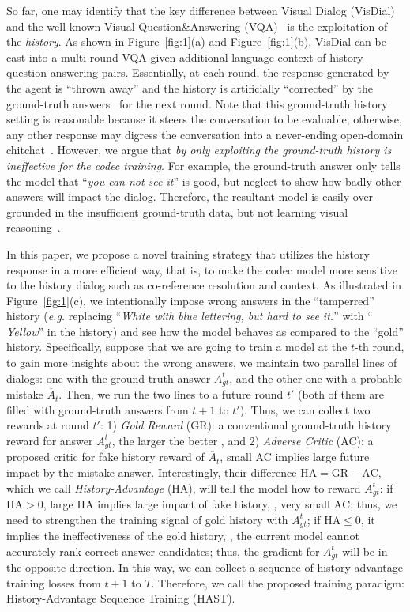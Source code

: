 \documentclass[10pt,twocolumn,letterpaper]{article}
\begin{document}
So far, one may identify that the key difference between Visual Dialog (VisDial) and the well-known Visual Question\&Answering (VQA)~\cite{antol2015vqa} is the exploitation of the \emph{history}. As shown in Figure~\ref{fig:1}(a) and Figure~\ref{fig:1}(b), VisDial can be cast into a multi-round VQA given additional language context of history question-answering pairs. Essentially, at each round, the response generated by the agent is ``thrown away'' and the history is artificially ``corrected'' by the ground-truth answers~\cite{das2017visual} for the next round. Note that this ground-truth history setting is reasonable because it steers the conversation to be evaluable; otherwise, any other response may digress the conversation into a never-ending open-domain chitchat~\cite{quarteroni2009designing,higashinaka2014towards}. However, we argue that \emph{by only exploiting the ground-truth history is ineffective for the codec training}. For example, the ground-truth answer only tells the model that ``\emph{you can not see it}'' is good, but neglect to show how badly other answers will impact the dialog. Therefore, the resultant model is easily over-grounded in the insufficient ground-truth data, but not learning visual reasoning~\cite{lake2017building}. 


In this paper, we propose a novel training strategy that utilizes the history response in a more efficient way, that is, to make the codec model more sensitive to the history dialog such as co-reference resolution and context. As illustrated in Figure~\ref{fig:1}(c), we intentionally impose wrong answers in the ``tamperred'' history (\emph{e.g.} replacing ``\emph{White with blue lettering, but hard to see it.}'' with ``\emph{ Yellow}'' in the history) and see how the model behaves as compared to the ``gold'' history. Specifically, suppose that we are going to train a model at the $t$-th round, to gain more insights about the wrong answers, we maintain two parallel lines of dialogs: one with the ground-truth answer $A^t_{gt}$, and the other one with a probable mistake $\overline{A}_t$. Then, we run the two lines to a future round $t'$ (both of them are filled with ground-truth answers from $t+1$ to $t'$). Thus, we can collect two rewards at round $t'$: 1) \emph{Gold Reward} (GR): a conventional ground-truth history reward for answer $A^t_{gt}$, the larger the better , and 2) \emph{Adverse Critic} (AC): a proposed critic for fake history reward of $\overline{A}_t$, small AC implies large future impact by the mistake answer. Interestingly, their difference $\textrm{HA} = \textrm{GR} - \textrm{AC}$, which we call \textit{History-Advantage} (HA), will tell the model how to reward $A^t_{gt}$: if $\textrm{HA} > 0$, large $\textrm{HA}$ implies large impact of fake history, \ie, very small $\textrm{AC}$; thus, we need to strengthen the training signal of gold history with $A^t_{gt}$; if $\textrm{HA} \leq 0$, it implies the ineffectiveness of the gold history, \ie, the current model cannot accurately rank correct answer candidates; thus, the gradient for $A^t_{gt}$ will be in the opposite direction. In this way, we can collect a sequence of history-advantage training losses from $t+1$ to $T$. Therefore, we call the proposed training paradigm: History-Advantage Sequence Training (HAST).
\end{document}
